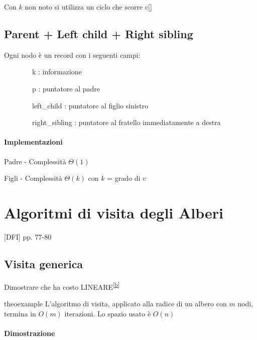 {{Con $k$ non noto si utilizza un ciclo che scorre c{[}{]}}



\subsection{Parent + Left child + Right sibling}

{Ogni nodo è un record con i seguenti campi:}

{~~~~~~~~k : informazione}

{~~~~~~~~p : puntatore al padre}

{~~~~~~~~left\_child : puntatore al figlio sinistro}

{~~~~~~~~right\_sibling : puntatore al fratello immediatamente a destra}

\paragraph{Implementazioni}

{Padre - Complessità $\Theta(1)$}



{Figli - Complessità $\Theta(k)$ con $k$ = grado di $v$}



\section{Algoritmi di visita degli Alberi}

{{[}DFI{]} pp. 77-80}

\subsection{Visita generica}



{Dimostrare che ha costo LINEARE}\textsuperscript{\protect\hyperlink{cmnt2}{{[}b{]}}}

\begin{teorema}{ }{theoexample}
L'algoritmo di visita, applicato alla radice di un albero con $m$ nodi, termina in $O(m)$ iterazioni. Lo spazio usato è $O(n)$
\end{teorema}

\paragraph{Dimostrazione}

}
